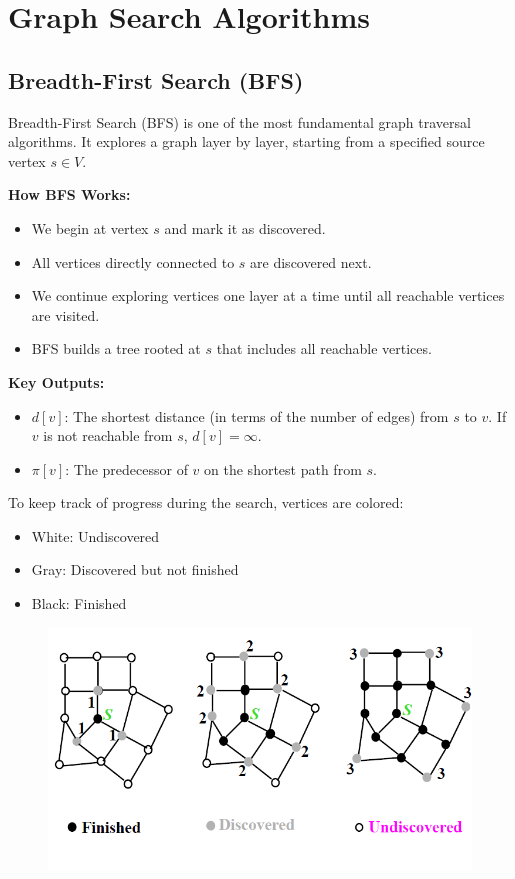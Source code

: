 \section{Graph Search Algorithms}
\subsection{Breadth-First Search (BFS)}
Breadth-First Search (BFS) is one of the most fundamental graph traversal algorithms. It explores a graph layer by layer, starting from a specified source vertex $s\in V$.

\textbf{How BFS Works:}
\begin{itemize}
    \item We begin at vertex $s$ and mark it as discovered.
    \item All vertices directly connected to $s$ are discovered next.
    \item We continue exploring vertices one layer at a time until all reachable vertices are visited.
    \item BFS builds a tree rooted at $s$ that includes all reachable vertices.
\end{itemize}

\textbf{Key Outputs:}
\begin{itemize}
    \item $d[v]$: The shortest distance (in terms of the number of edges) from $s$ to $v$. If $v$ is not reachable from $s$, $d[v] = \infty$.
    \item $\pi[v]$: The predecessor of $v$ on the shortest path from $s$.
\end{itemize}

To keep track of progress during the search, vertices are colored:
\begin{itemize}
    \item White: Undiscovered
    \item Gray: Discovered but not finished
    \item Black: Finished
\end{itemize}
\begin{figure}[h]
    \centering
\includegraphics[width=0.75\linewidth]{Breadth-Firs-Search.png}
    \caption{}
    \label{fig:enter-label}
\end{figure}


